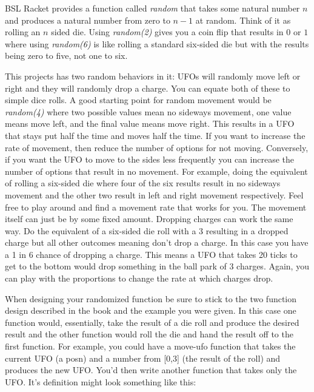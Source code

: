\documentclass[nobib]{tufte-handout}
\begin{document}
BSL Racket provides a function called \textit{random} that takes some natural number \(n\) and produces a natural number from zero to
\(n-1\) at random. Think of it as rolling an \(n\) sided die.  Using \textit{random(2)} gives you a coin flip that results in \(0\) or \(1\) where using \textit{random(6)} is like rolling a standard six-sided die but with the results being zero to five, not one to six.

This projects has two random behaviors in it: UFOs will randomly move left or right and they will randomly drop a charge. You can equate both of these to simple dice rolls. A good starting point for random movement would be \textit{random(4)} where two possible values mean no sideways movement, one value means move left, and the final value means move right. This results in a UFO that stays put half the time and moves half the time. If you want to increase the rate of movement, then reduce the number of options for not moving. Conversely, if you want the UFO to move to the sides less frequently you can increase the number of options that result in no movement. For example, doing the equivalent of rolling a six-sided die where four of the six results result in no sideways movement and the other two result in left and right movement respectively.  Feel free to play around and find a movement rate that works for you. The movement itself can just be by some fixed amount. Dropping charges can work the same way. Do the equivalent of a six-sided die roll with a 3 resulting in a dropped charge but all other outcomes meaning don't drop a charge. In this case you have a 1 in 6 chance of dropping a charge. This means a UFO that takes 20 ticks to get to the bottom would drop something in the ball park of 3 charges. Again, you can play with the proportions to change the rate at which charges drop.

When designing your randomized function be sure to stick to the two function design described in the book and the example you were given. In this case one function would, essentially, take the result of a die roll and produce the desired result and the other function would roll the die and hand the result off to the first function. For example, you could have a move-ufo function that takes the current UFO (a posn) and a number from [0,3] (the result of the roll) and produces the new UFO. You'd then write another function that takes only the UFO. It's definition might look something like this:
\end{document}
